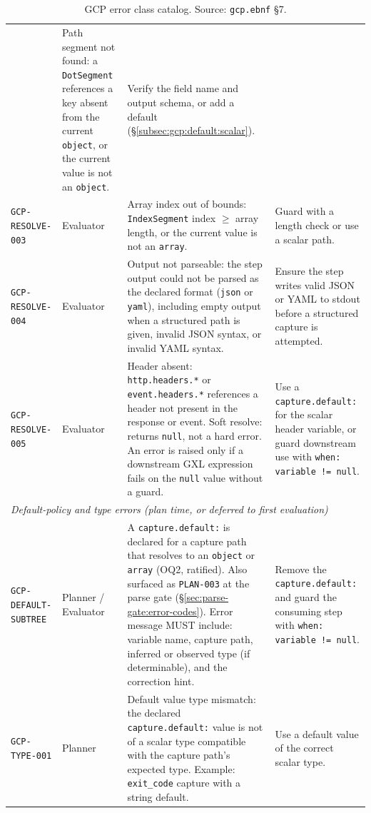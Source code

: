 \begin{table}[ht]
\begin{tabular}{p{3.8cm}p{2.0cm}p{4.8cm}p{2.4cm}}
  & Path segment not found: a \texttt{DotSegment} references a key absent from the current \texttt{object}, or the current value is not an \texttt{object}.
  & Verify the field name and output schema, or add a default (\S\ref{subsec:gcp:default:scalar}). \\
\texttt{GCP-RESOLVE-003}
  & Evaluator
  & Array index out of bounds: \texttt{IndexSegment} index $\geq$ array length, or the current value is not an \texttt{array}.
  & Guard with a length check or use a scalar path. \\
\texttt{GCP-RESOLVE-004}
  & Evaluator
  & Output not parseable: the step output could not be parsed as the declared format (\texttt{json} or \texttt{yaml}), including empty output when a structured path is given, invalid JSON syntax, or invalid YAML syntax.
  & Ensure the step writes valid JSON or YAML to stdout before a structured capture is attempted. \\
\texttt{GCP-RESOLVE-005}
  & Evaluator
  & Header absent: \texttt{http.headers.*} or \texttt{event.headers.*} references a header not present in the response or event.  Soft resolve: returns \texttt{null}, not a hard error.  An error is raised only if a downstream GXL expression fails on the \texttt{null} value without a guard.
  & Use a \texttt{capture.default:} for the scalar header variable, or guard downstream use with \texttt{when: variable != null}. \\
\hline
\multicolumn{4}{l}{\textit{Default-policy and type errors (plan time, or deferred to first evaluation)}} \\
\hline
\texttt{GCP-DEFAULT-SUBTREE}
  & Planner / Evaluator
  & A \texttt{capture.default:} is declared for a capture path that resolves to an \texttt{object} or \texttt{array} (OQ2, ratified).  Also surfaced as \texttt{PLAN-003} at the parse gate (\S\ref{sec:parse-gate:error-codes}).  Error message MUST include: variable name, capture path, inferred or observed type (if determinable), and the correction hint.
  & Remove the \texttt{capture.default:} and guard the consuming step with \texttt{when: variable != null}. \\
\texttt{GCP-TYPE-001}
  & Planner
  & Default value type mismatch: the declared \texttt{capture.default:} value is not of a scalar type compatible with the capture path's expected type.  Example: \texttt{exit\_code} capture with a string default.
  & Use a default value of the correct scalar type. \\
\hline
\end{tabular}
\caption{GCP error class catalog.
  Source: \texttt{gcp.ebnf} \S7.}
\label{tab:gcp-errors}
\end{table}
